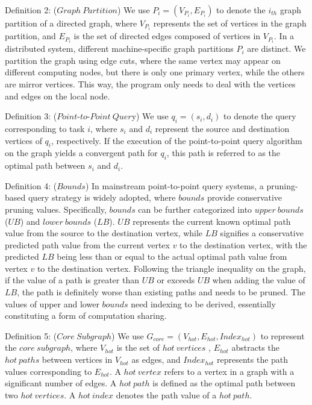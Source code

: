 \documentclass[lettersize,journal]{IEEEtran} %
\begin{document}
Definition 2: ($Graph~Partition$) We use $P_i=(V_{P_i},E_{P_i})$ to denote the $i_{th}  $ graph partition of a directed graph, where $V_{P_i}$ represents the set of vertices in the graph partition, and $E_{P_i}$ is the set of directed edges composed of vertices in $V_{P_i}$. In a distributed system, different machine-specific graph partitions $P_i$ are distinct. We partition the graph using edge cuts\cite{x-stream}\cite{gridgraph}, where the same vertex may appear on different computing nodes, but there is only one primary vertex, while the others are mirror vertices. This way, the program only needs to deal with the vertices and edges on the local node.

Definition 3: ($Point \text{-} to \text{-} Point~Quer$y) We use $q_i=(s_i,d_i)$ to denote the query corresponding to task $i$, where $s_i$ and $d_i$ represent the source and destination vertices of $q_i$, respectively. If the execution of the point-to-point query algorithm on the graph yields a convergent path for $q_i$, this path is referred to as the optimal path between $s_i$ and $d_i$.

Definition 4: ($Bounds$) In mainstream point-to-point query systems, a pruning-based query strategy is widely adopted, where $bounds$ provide conservative pruning values. Specifically, $bounds$ can be further categorized into $upper~bounds$ ($UB$) and $lower~bounds$ ($LB$). $UB$ represents the current known optimal path value from the source to the destination vertex, while $LB$ signifies a conservative predicted path value from the current vertex $v$ to the destination vertex, with the predicted $LB$ being less than or equal to the actual optimal path value from vertex $v$ to the destination vertex. Following the triangle inequality on the graph, if the value of a path is greater than $UB$ or exceeds $UB$ when adding the value of $LB$, the path is definitely worse than existing paths and needs to be pruned. The values of upper and lower $bounds$ need indexing to be derived, essentially constituting a form of computation sharing.

Definition 5: ($Core~Subgraph$) We use $G_{core}=(V_{hot},E_{hot},Index_{hot})$ to represent the $core~subgraph$, where $V_{hot}$ is the set of $hot~vertices$ , $E_{hot}$ abstracts the $hot~paths$ between vertices in $V_{hot}$ as edges, and $Index_{hot}$ represents the path values corresponding to $E_{hot}$. A $hot~vertex$ refers to a vertex in a graph with a significant number of edges. A $hot~path$ is defined as the optimal path between two $hot~vertices$. A $hot~index$ denotes the path value of a $hot~path$.
\end{document}
